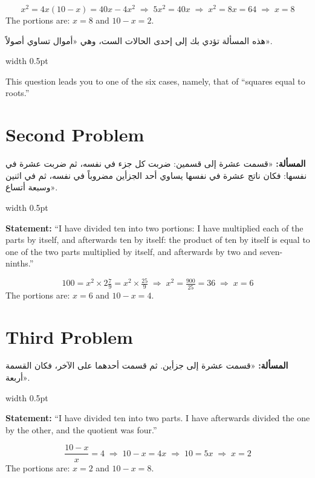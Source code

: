 \documentclass[10pt,a4paper]{book}
\newlength{\colwidth}
\newcommand{\bilingualpair}[2]{%
  \noindent
  \begin{minipage}[t]{\colwidth}
  \begin{flushright}
  \vspace{0pt}
  {\arabicfont\small #1}
  \end{flushright}
  \end{minipage}%
  \hfill\textcolor{columnsepclr}{\vrule width 0.5pt}\hfill
  \begin{minipage}[t]{\colwidth}
  \vspace{0pt}
  {\small #2}
  \end{minipage}%
  \par\vspace{0.6em}
}
\begin{document}
\begin{mathbox}
\begin{equation}
x^2 = 4x(10-x) = 40x - 4x^2 \;\Rightarrow\; 5x^2 = 40x \;\Rightarrow\; x^2 = 8x = 64 \;\Rightarrow\; x = 8
\end{equation}
The portions are: $x = 8$ and $10 - x = 2$.
\end{mathbox}

\bilingualpair{
هذه المسألة تؤدي بك إلى إحدى الحالات الست، وهي «أموال
تساوي أصولاً».
}{
This question leads you to one of the six cases, namely, that of ``squares
equal to roots.''
}

\section*{Second Problem}

\bilingualpair{
\textbf{المسألة:} «قسمت عشرة إلى قسمين: ضربت كل جزء في نفسه،
ثم ضربت عشرة في نفسها: فكان ناتج عشرة في نفسها يساوي أحد
الجزأين مضروباً في نفسه، ثم في اثنين وسبعة أتساع».
}{
\textbf{Statement:} ``I have divided ten into two portions: I have multiplied
each of the parts by itself, and afterwards ten by itself: the product of ten
by itself is equal to one of the two parts multiplied by itself, and
afterwards by two and seven-ninths.''
}

\begin{mathbox}
\begin{equation}
100 = x^2 \times 2\tfrac{7}{9} = x^2 \times \tfrac{25}{9} \;\Rightarrow\;
x^2 = \tfrac{900}{25} = 36 \;\Rightarrow\; x = 6
\end{equation}
The portions are: $x = 6$ and $10 - x = 4$.
\end{mathbox}

\section*{Third Problem}

\bilingualpair{
\textbf{المسألة:} «قسمت عشرة إلى جزأين. ثم قسمت أحدهما على
الآخر، فكان القسمة أربعة».
}{
\textbf{Statement:} ``I have divided ten into two parts. I have afterwards
divided the one by the other, and the quotient was four.''
}

\begin{mathbox}
\begin{equation}
\frac{10 - x}{x} = 4 \;\Rightarrow\; 10 - x = 4x \;\Rightarrow\; 10 = 5x \;\Rightarrow\; x = 2
\end{equation}
The portions are: $x = 2$ and $10 - x = 8$.
\end{mathbox}
\end{document}
